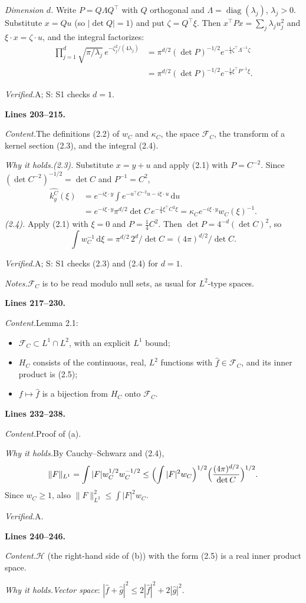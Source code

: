 \documentclass[11pt]{amsart}
\newcommand{\dd}{\,\mathrm{d}}
\newcommand{\FC}[1]{\mathcal{F}_{#1}}
\newcommand{\hatf}[1]{\widehat{#1}}
\newcommand{\tp}{\top}
\newcommand{\src}[1]{\par\bigskip\noindent\textbf{Lines #1.}\enspace}
\newcommand{\content}{\par\smallskip\noindent\textit{Content.}\enspace}
\newcommand{\why}{\par\smallskip\noindent\textit{Why it holds.}\enspace}
\newcommand{\verified}{\par\smallskip\noindent\textit{Verified.}\enspace}
\newcommand{\notes}{\par\smallskip\noindent\textit{Notes.}\enspace}
\newcommand{\tA}{\textsf{A}}
\newcommand{\tS}{\textsf{S}}
\begin{document}
\emph{Dimension $d$.} Write $P=Q\Lambda Q^\tp$ with $Q$ orthogonal and $\Lambda=\operatorname{diag}(\lambda_j)$,
$\lambda_j>0$. Substitute $x=Qu$ (so $|\det Q|=1$) and put $\zeta=Q^\tp\xi$. Then $x^\tp Px=\sum_j\lambda_ju_j^2$ and
$\xi\cdot x=\zeta\cdot u$, and the integral factorizes:
\begin{align*}
\prod_{j=1}^d\sqrt{\pi/\lambda_j}\,e^{-\zeta_j^2/(4\lambda_j)}
&=\pi^{d/2}(\det P)^{-1/2}e^{-\frac14\zeta^\tp\Lambda^{-1}\zeta}\\
&=\pi^{d/2}(\det P)^{-1/2}e^{-\frac14\xi^\tp P^{-1}\xi}.
\end{align*}
\verified \tA; \tS: S1 checks $d=1$.

\src{203--215}
\content The definitions (2.2) of $w_C$ and $\kappa_C$, the space $\FC{C}$, the transform of a kernel section (2.3),
and the integral (2.4).
\why \emph{(2.3).} Substitute $x=y+u$ and apply (2.1) with $P=C^{-2}$. Since $(\det C^{-2})^{-1/2}=\det C$ and
$P^{-1}=C^2$,
\begin{align*}
\hatf{k^C_y}(\xi)&=e^{-i\xi\cdot y}\int e^{-u^\tp C^{-2}u-i\xi\cdot u}\dd u\\
&=e^{-i\xi\cdot y}\pi^{d/2}\det C\,e^{-\frac14\xi^\tp C^2\xi}=\kappa_Ce^{-i\xi\cdot y}w_C(\xi)^{-1}.
\end{align*}
\emph{(2.4).} Apply (2.1) with $\xi=0$ and $P=\frac14C^2$. Then $\det P=4^{-d}(\det C)^2$, so
\[
\int w_C^{-1}\dd\xi=\pi^{d/2}\,2^d/\det C=(4\pi)^{d/2}/\det C .
\]
\verified \tA; \tS: S1 checks (2.3) and (2.4) for $d=1$.
\notes $\FC{C}$ is to be read modulo null sets, as usual for $L^2$-type spaces.

\src{217--230}
\content Lemma 2.1:
\begin{itemize}
\item[(a)] $\FC{C}\subset L^1\cap L^2$, with an explicit $L^1$ bound;
\item[(b)] $H_C$ consists of the continuous, real, $L^2$ functions with $\hatf f\in\FC{C}$, and its inner product is
(2.5);
\item[(c)] $f\mapsto\hatf f$ is a bijection from $H_C$ onto $\FC{C}$.
\end{itemize}

\src{232--238}
\content Proof of (a).
\why By Cauchy--Schwarz and (2.4),
\[
\|F\|_{L^1}=\int|F|w_C^{1/2}w_C^{-1/2}\le\Bigl(\int|F|^2w_C\Bigr)^{1/2}\Bigl(\frac{(4\pi)^{d/2}}{\det C}\Bigr)^{1/2}.
\]
Since $w_C\ge1$, also $\|F\|_{L^2}^2\le\int|F|^2w_C$.
\verified \tA.

\src{240--246}
\content $\mathcal H$ (the right-hand side of (b)) with the form (2.5) is a real inner product space.
\why \emph{Vector space}: $|\hatf f+\hatf g|^2\le2|\hatf f|^2+2|\hatf g|^2$.
\end{document}
